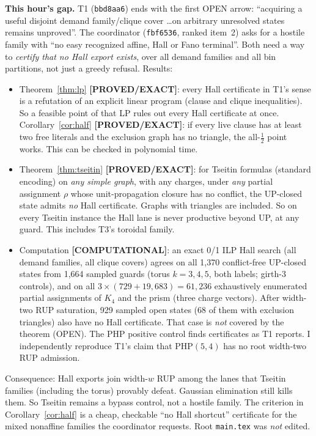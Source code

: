 \documentclass[11pt]{article}
\theoremstyle{definition}
\theoremstyle{remark}
\newcommand{\lab}[1]{\textbf{[#1]}}
\begin{document}
\textbf{This hour's gap.} T1 (\texttt{bbd8aa6}) ends with the first OPEN arrow:
``acquiring a useful disjoint demand family/clique cover \ldots on arbitrary unresolved states
remains unproved''. The coordinator (\texttt{fbf6536}, ranked item~2) asks for a hostile family
with ``no easy recognized affine, Hall or Fano terminal''. Both need a way to \emph{certify that
no Hall export exists}, over all demand families and all bin partitions, not just a greedy
refusal. Results:
\begin{itemize}
\item Theorem~\ref{thm:lp} \lab{PROVED/EXACT}: every Hall certificate in T1's sense is a
refutation of an explicit linear program (clause and clique inequalities). So a feasible point
of that LP rules out every Hall certificate at once. Corollary~\ref{cor:half}
\lab{PROVED/EXACT}: if every live clause has at least two free literals and the exclusion graph
has no triangle, the all-$\tfrac12$ point works. This can be checked in polynomial time.
\item Theorem~\ref{thm:tseitin} \lab{PROVED/EXACT}: for Tseitin formulas (standard encoding) on
\emph{any simple graph}, with any charges, under \emph{any} partial assignment $\rho$ whose
unit-propagation closure has no conflict, the UP-closed state admits \emph{no} Hall certificate.
Graphs with triangles are included. So on every Tseitin instance the Hall lane is never
productive beyond UP, at any guard. This includes T3's toroidal family.
\item Computation \lab{COMPUTATIONAL}: an exact 0/1 ILP Hall search (all demand families, all
clique covers) agrees on all 1{,}370 conflict-free UP-closed states from 1{,}664 sampled guards (torus $k=3,4,5$, both labels; girth-3 controls), and on all $3\times(729+19{,}683)=61{,}236$ exhaustively enumerated partial assignments of $K_4$ and the prism (three charge vectors).
After width-two RUP saturation, 929 sampled open states (68 of them with exclusion triangles)
also have no Hall certificate. That case is \emph{not} covered by the theorem (OPEN). The PHP
positive control finds certificates as T1 reports. I independently reproduce T1's claim that
PHP$(5,4)$ has no root width-two RUP admission.
\end{itemize}
Consequence: Hall exports join width-$w$ RUP among the lanes that Tseitin families
(including the torus) provably defeat. Gaussian elimination still kills them. So Tseitin
remains a bypass control, not a hostile family. The criterion in
Corollary~\ref{cor:half} is a cheap, checkable ``no Hall shortcut'' certificate for the mixed
nonaffine families the coordinator requests. Root \texttt{main.tex} was \emph{not} edited.
\end{document}
